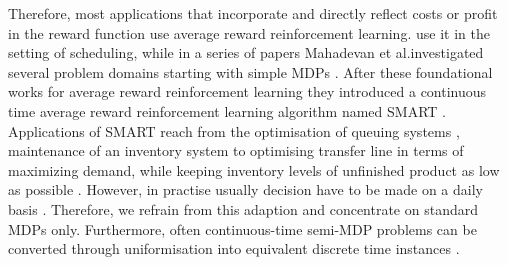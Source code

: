 \documentclass[envcountsame]{llncs}
\begin{document}
Therefore, most applications that incorporate and directly reflect costs or profit in the reward
function use average reward reinforcement learning. \citet{aydin2000dynamic} use it in the setting
of scheduling, while in a series of papers Mahadevan et al.\@ investigated several problem domains
starting with simple MDPs
\citep{Mahadevan96_AverageRewardReinforcementLearningFoundationsAlgorithmsAndEmpiricalResults,Mahadevan96_OptimalityCriteriaInReinforcementLearning}.
After these foundational works for average reward reinforcement learning they introduced a
continuous time average reward reinforcement learning algorithm named SMART
\citep{Mahadevan97_SelfimprovingFactorySimulationUsingContinuoustimeAveragerewardReinforcementLearning}.
Applications of SMART reach from the optimisation of queuing systems
\citep{Mahadevan96_AnAveragerewardReinforcementLearningAlgorithmForComputingBiasoptimalPolicies,Mahadevan96_SensitiveDiscountOptimalityUnifyingDiscountedAndAverageRewardReinforcementLearning},
maintenance of an inventory system
\citep{Das99_SolvingSemiMarkovDecisionProblemsUsingAverageRewardReinforcementLearning} to optimising
transfer line in terms of maximizing demand, while keeping inventory levels of unfinished product as
low as possible \citep{Mahadevan98_OptimizingProductionManufacturingUsingReinforcementLearning}.
However, in practise usually decision have to be made on a daily basis
\citep{enns2004work,GeldersvanW1982}. Therefore, we refrain from this adaption and concentrate on
standard MDPs only. Furthermore, often continuous-time semi-MDP problems can be converted through
uniformisation into equivalent discrete time instances
\citep[see][]{Puterman94,bertsekas1995dynamic}.
\end{document}
